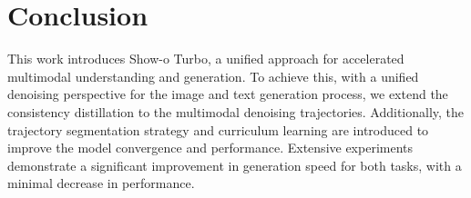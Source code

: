 \section{Conclusion}
\label{sec:conclusion}
This work introduces Show-o Turbo, a unified approach for accelerated multimodal understanding and generation. 
To achieve this, with a unified denoising perspective for the image and text generation process, we extend the consistency distillation to the multimodal denoising trajectories. 
Additionally, the trajectory segmentation strategy and curriculum learning are introduced to improve the model convergence and performance. 
Extensive experiments demonstrate a significant improvement in generation speed for both tasks, with a minimal decrease in performance.


